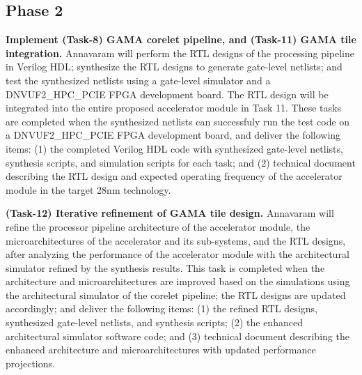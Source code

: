 \subsection{Phase 2}
%

\vspace{3pt}
\noindent
\textbf{Implement (Task-8) GAMA corelet pipeline, and (Task-11) GAMA tile integration.}
 Annavaram will perform the RTL designs of the processing pipeline in Verilog HDL; synthesize the RTL designs to generate gate-level netlists; and test the synthesized netlists using a gate-level simulator and a DNVUF2\_HPC\_PCIE FPGA development board.  The RTL design will be integrated into the entire proposed accelerator module in Task 11. 
These tasks are completed when the synthesized netlists can successfuly run the test code on a DNVUF2\_HPC\_PCIE FPGA development board, and deliver the following items:
(1) the completed Verilog HDL code with synthesized gate-level netlists, synthesis scripts, and simulation scripts for each task; and 
(2) technical document describing the RTL design and expected operating frequency of the accelerator module in the target 28nm technology.


\vspace{3pt}
\noindent
\textbf{(Task-12) Iterative refinement of GAMA tile design.} 
 Annavaram will refine the processor pipeline architecture of the accelerator module, the microarchitectures of the accelerator and its sub-systems, and the RTL designs, after analyzing the performance of the accelerator module with the architectural simulator refined by the synthesis results.
This task is completed when the architecture and microarchitectures are improved based on the simulations using the architectural simulator of the corelet pipeline; 
the RTL designs are updated accordingly; and 
deliver the following items:
(1) the refined RTL designs, synthesized gate-level netlists, and synthesis scripts; 
(2) the enhanced architectural simulator software code; and
(3) technical document describing the enhanced architecture and microarchitectures with updated performance projections.

